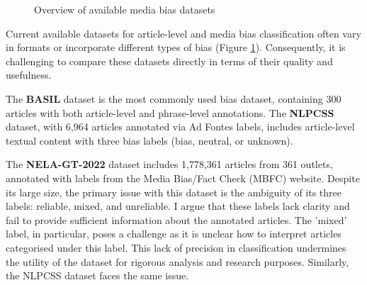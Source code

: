 \begin{figure}[htbp]
    \centering
    \caption{Overview of available media bias datasets \cite{rodrigo-2024-systematic-review-media-bias}}
    \label{fig:media-bias-datasets-overview}
\end{figure}

Current available datasets for article-level and media bias classification often vary in formats or incorporate different types of bias \cite{rodrigo-2024-systematic-review-media-bias} (Figure \ref{fig:media-bias-datasets-overview}). Consequently, it is challenging to compare these datasets directly in terms of their quality and usefulness.

The \textbf{BASIL} dataset \cite{fan-2019-basil} is the most commonly used bias dataset, containing 300 articles with both article-level and phrase-level annotations. The \textbf{NLPCSS} \cite{chen-2020-nlpcss} dataset, with 6,964 articles annotated via Ad Fontes labels, includes article-level textual content with three bias labels (bias, neutral, or unknown).

The \textbf{NELA-GT-2022} dataset \cite{gruppi-2023-nela-gt-2022} includes 1,778,361 articles from 361 outlets, annotated with labels from the Media Bias/Fact Check (MBFC) \cite{mbfc} website. Despite its large size, the primary issue with this dataset is the ambiguity of its three labels: reliable, mixed, and unreliable. I argue that these labels lack clarity and fail to provide sufficient information about the annotated articles. The 'mixed' label, in particular, poses a challenge as it is unclear how to interpret articles categorised under this label. This lack of precision in classification undermines the utility of the dataset for rigorous analysis and research purposes. Similarly, the NLPCSS dataset faces the same issue.

